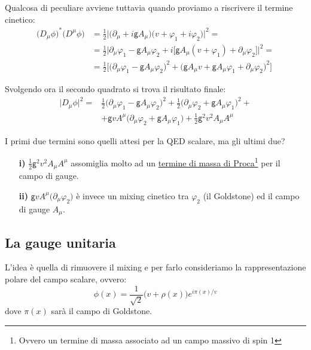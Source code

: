 \documentclass[../main.tex]{subfiles}
\begin{document}
Qualcosa di peculiare avviene tuttavia quando proviamo a riscrivere il termine cinetico:
\begin{align*}
    \big(D_\mu\phi\big)^\ast\big(D^\mu\phi\big) &=\frac{1}{2}\Big| \big(\partial_\mu +i\mathsf gA_\mu\big)\big(v+\varphi_1+i\varphi_2\big)\Big|^2 = \\
    &= \frac{1}{2} \Big| \partial_\mu \varphi_1 - \mathsf gA_\mu\varphi_2 +i \big[\mathsf gA_\mu(v+\varphi_1) + \partial_\mu \varphi_2\big]\Big|^2 =\\
    &= \frac{1}{2} \Big[ \big(\partial_\mu \varphi_1 - \mathsf gA_\mu\varphi_2\big)^2 + \big(\mathsf gA_\mu v+\mathsf gA_\mu\varphi_1 + \partial_\mu \varphi_2\big)^2\Big] 
\end{align*}

Svolgendo ora il secondo quadrato si trova il risultato finale:
\begin{equation}
    \begin{aligned}
        \big|D_\mu\phi\big|^2 =& \frac{1}{2}\big(\partial_\mu \varphi_1 - \mathsf gA_\mu\varphi_2\big)^2 + \frac{1}{2}\big(\partial_\mu \varphi_2 +\mathsf gA_\mu\varphi_1 \big)^2+\\
        &+\mathsf gv A^\mu \big(\partial_\mu \varphi_2 +\mathsf gA_\mu\varphi_1 \big) +\frac{1}{2}\mathsf g^2v^2 A_\mu A^\mu
    \end{aligned}
    \label{eq:peculiar_kinetic_term_U1SSB}
\end{equation}

I primi due termini sono quelli attesi per la QED scalare, ma gli ultimi due?
\begin{enumerate}
    \item[\textbf{i)}] $\frac{1}{2}\mathsf g^2v^2 A_\mu A^\mu$ assomiglia molto ad un \href{https://en.wikipedia.org/wiki/Proca_action}{termine di massa di Proca}\footnote{Ovvero un termine di massa associato ad un campo massivo di spin 1} per il campo di gauge.
    \item[\textbf{ii)}] $\mathsf gv A^\mu \big(\partial_\mu \varphi_2\big)$ è invece un mixing cinetico tra $\varphi_2$ (il Goldstone) ed il campo di gauge $A_\mu$.
    \end{enumerate}

\subsection{La gauge unitaria}
L'idea è quella di rimuovere il mixing e per farlo consideriamo la rappresentazione polare del campo scalare, ovvero:
\[
\phi(x) = \frac{1}{\sqrt{2}} \big(v+\rho(x)\big)e^{i\pi(x)/v}
\]
dove $\pi(x)$ sarà il campo di Goldstone.
\end{document}
